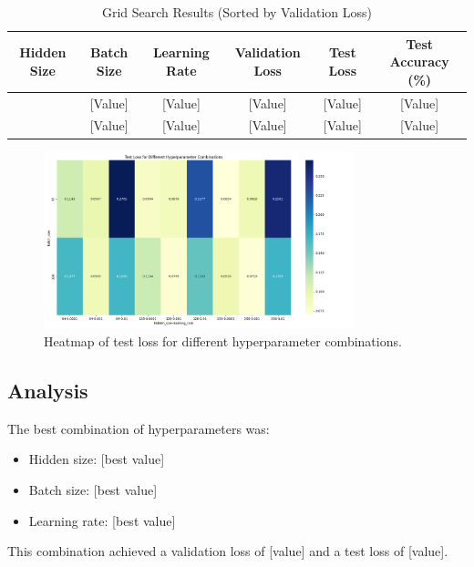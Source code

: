 \documentclass[12pt]{article}
\begin{document}
\begin{table}[H]
    \centering
    \caption{Grid Search Results (Sorted by Validation Loss)}
    \label{tab:grid_search}
    \begin{tabular}{cccccc}
        \toprule
        Hidden Size & Batch Size & Learning Rate & Validation Loss & Test Loss & Test Accuracy (\%) \\
        \midrule
        [Value] & [Value] & [Value] & [Value] & [Value] & [Value] \\
        [Value] & [Value] & [Value] & [Value] & [Value] & [Value] \\
        \bottomrule
    \end{tabular}
\end{table}

\begin{figure}[H]
    \centering
    \includegraphics[width=0.8\textwidth]{grid_search_heatmap.png}
    \caption{Heatmap of test loss for different hyperparameter combinations.}
    \label{fig:heatmap}
\end{figure}

\subsection{Analysis}
The best combination of hyperparameters was:
\begin{itemize}
    \item Hidden size: [best value]
    \item Batch size: [best value]
    \item Learning rate: [best value]
\end{itemize}

This combination achieved a validation loss of [value] and a test loss of [value].
\end{document}

